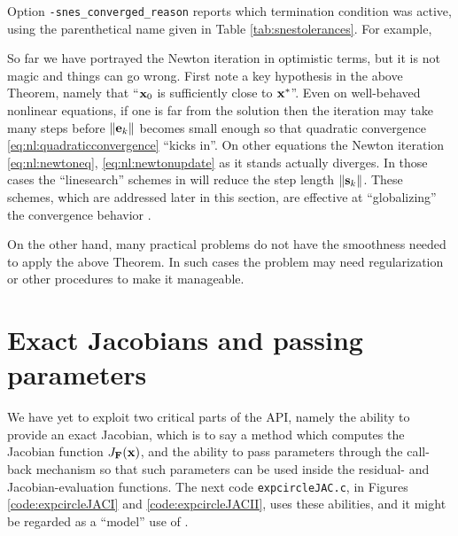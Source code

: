\medskip
Option \texttt{-snes\_converged\_reason} reports which termination condition was active, using the parenthetical name given in Table \ref{tab:snestolerances}.  For example,

So far we have portrayed the Newton iteration in optimistic terms, but it is not magic and things can go wrong.  First note a key hypothesis in the above Theorem, namely that ``$\mathbf{x}_0$ is sufficiently close to $\mathbf{x}^*$''.  Even on well-behaved nonlinear equations, if one is far from the solution then the iteration may take many steps before $\|\mathbf{e}_k\|$ becomes small enough so that quadratic convergence \eqref{eq:nl:quadraticconvergence} ``kicks in''.  On other equations the Newton iteration \eqref{eq:nl:newtoneq}, \eqref{eq:nl:newtonupdate} as it stands actually diverges.  In those cases the ``linesearch'' schemes in \PETSc will reduce the step length $\|\mathbf{s}_k\|$.  These schemes, which are addressed later in this section, are effective at ``globalizing'' the convergence behavior \citep{Kelley2003}.

On the other hand, many practical problems do not have the smoothness needed to apply the above Theorem.  In such cases the problem may need regularization or other procedures to make it manageable.




\section{Exact Jacobians and passing parameters}

We have yet to exploit two critical parts of the \pSNES API, namely the ability to provide an exact Jacobian, which is to say a method which computes the Jacobian function $J_{\mathbf{F}}(\mathbf{x})$, and the ability to pass parameters through the call-back mechanism so that such parameters can be used inside the residual- and Jacobian-evaluation functions.  The next code \texttt{expcircleJAC.c}, in Figures \ref{code:expcircleJACI} and \ref{code:expcircleJACII}, uses these abilities, and it might be regarded as a ``model'' use of \pSNES.


